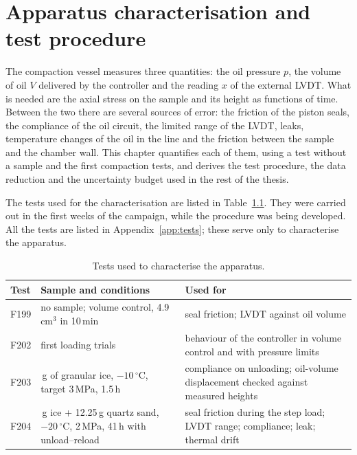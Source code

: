 \chapter{Apparatus characterisation and test procedure}
\label{ch:characterisation}%

The compaction vessel measures three quantities: the oil pressure $p$, the volume of oil $V$ delivered by the controller and the reading $x$ of the external LVDT. What is needed are the axial stress on the sample and its height as functions of time. Between the two there are several sources of error: the friction of the piston seals, the compliance of the oil circuit, the limited range of the LVDT, leaks, temperature changes of the oil in the line and the friction between the sample and the chamber wall. This chapter quantifies each of them, using a test without a sample and the first compaction tests, and derives the test procedure, the data reduction and the uncertainty budget used in the rest of the thesis.

The tests used for the characterisation are listed in Table~\ref{tab:commissioning}. They were carried out in the first weeks of the campaign, while the procedure was being developed. All the tests are listed in Appendix~\ref{app:tests}; these serve only to characterise the apparatus.

\begin{table}[H]
    \centering
    \caption{Tests used to characterise the apparatus.}
    \label{tab:commissioning}
    \begin{tabularx}{\textwidth}{|l|>{\raggedright\arraybackslash}p{4.2cm}|>{\raggedright\arraybackslash}X|}
        \hline
        \textbf{Test} & \textbf{Sample and conditions} & \textbf{Used for} \\
        \hline
        F199 & no sample; volume control, 4.9\,cm$^3$ in 10\,min & seal friction; LVDT against oil volume \\
        \hline
        F202 & first loading trials & behaviour of the controller in volume control and with pressure limits \\
        \hline
        F203 & 18\,g of granular ice, $-10\,^\circ$C, target 3\,MPa, 1.5\,h & compliance on unloading; oil-volume displacement checked against measured heights \\
        \hline
        F204 & 12.25\,g ice + 12.25\,g quartz sand, $-20\,^\circ$C, 2\,MPa, 41\,h with unload--reload & seal friction during the step load; LVDT range; compliance; leak; thermal drift \\
        \hline
    \end{tabularx}
\end{table}

